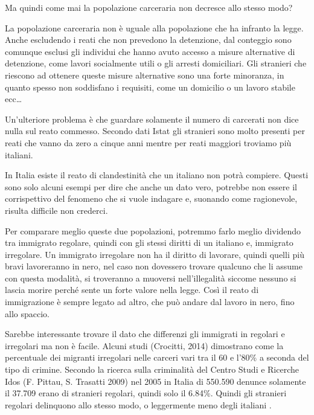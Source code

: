 \documentclass[12pt]{book} %
\begin{document}
\bigskip

Ma quindi come mai la popolazione carceraria non decresce allo stesso modo?

La popolazione carceraria non è uguale alla popolazione che ha infranto la legge. Anche escludendo i reati che non
prevedono la detenzione, dal conteggio sono comunque esclusi gli individui che hanno avuto accesso a misure alternative di
detenzione, come lavori socialmente utili o gli arresti domiciliari. Gli stranieri che riescono ad ottenere queste
misure alternative sono una forte minoranza, in quanto spesso non soddisfano i requisiti, come un domicilio o un lavoro stabile ecc…

Un'ulteriore problema è che guardare solamente il numero di carcerati non dice nulla sul reato commesso. Secondo dati Istat gli stranieri sono molto presenti per reati che vanno da zero a cinque anni mentre per reati maggiori troviamo più italiani.

\bigskip

In Italia esiste il reato di clandestinità che un italiano non potrà compiere. 
Questi sono solo alcuni esempi per dire che anche un dato vero, potrebbe non essere il corrispettivo del fenomeno che si vuole indagare e, suonando come ragionevole, risulta difficile non crederci.

Per comparare meglio queste due popolazioni, potremmo farlo meglio dividendo tra immigrato regolare, quindi con gli stessi diritti di un italiano e, immigrato irregolare. Un immigrato irregolare non ha il diritto di lavorare, quindi quelli più
bravi lavoreranno in nero, nel caso non dovessero trovare qualcuno che li assume con questa modalità, si troveranno a muoversi nell'illegalità siccome nessuno si lascia morire perché sente un forte valore nella legge. Così il reato di immigrazione è sempre legato ad altro, che può andare dal lavoro in nero, fino allo spaccio. 

Sarebbe interessante trovare il dato che differenzi gli immigrati in regolari e irregolari ma non è facile. Alcuni studi
(Crocitti,
2014) dimostrano come la percentuale dei migranti irregolari nelle carceri vari tra il 60 e l'80\% a
seconda del tipo di crimine. Secondo la ricerca sulla criminalità del Centro Studi e Ricerche Idos (F. Pittau, S.
Trasatti 2009) nel 2005 in Italia di 550.590 denunce solamente il 37.709 erano di stranieri regolari, quindi solo il
6.84\%. Quindi gli stranieri regolari delinquono allo stesso modo, o leggermente meno degli italiani  .
\end{document}
